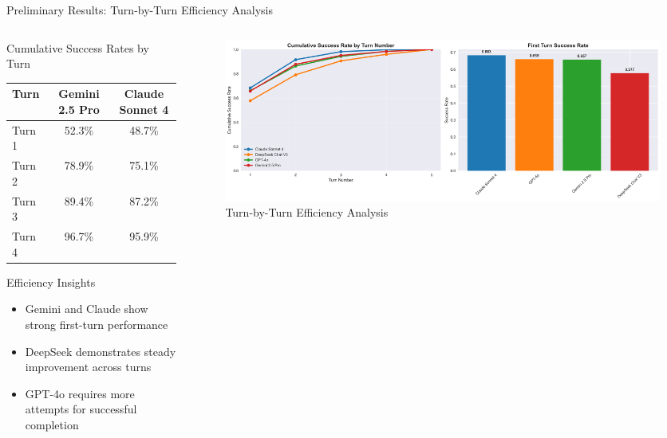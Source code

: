 \documentclass[aspectratio=169]{beamer}
\begin{document}
\begin{frame}{Preliminary Results: Turn-by-Turn Efficiency Analysis}
\begin{columns}[c]
\begin{column}{0.5\textwidth}
\begin{block}{Cumulative Success Rates by Turn}
\begin{center}
\begin{tabular}{lcc}
\toprule
\textbf{Turn} & \textbf{Gemini 2.5 Pro} & \textbf{Claude Sonnet 4} \\
\midrule
Turn 1 & 52.3\% & 48.7\% \\
Turn 2 & 78.9\% & 75.1\% \\
Turn 3 & 89.4\% & 87.2\% \\
Turn 4 & 96.7\% & 95.9\% \\
\bottomrule
\end{tabular}
\end{center}
\end{block}

\begin{block}{Efficiency Insights}
\begin{itemize}
    \item Gemini and Claude show strong first-turn performance
    \item DeepSeek demonstrates steady improvement across turns
    \item GPT-4o requires more attempts for successful completion
\end{itemize}
\end{block}
\end{column}

\begin{column}{0.48\textwidth}
\begin{figure}
\includegraphics[width=\textwidth]{comprehensive_figures/figure2_efficiency.png}
\caption{Turn-by-Turn Efficiency Analysis}
\end{figure}
\end{column}
\end{columns}
\end{frame}
\end{document}

